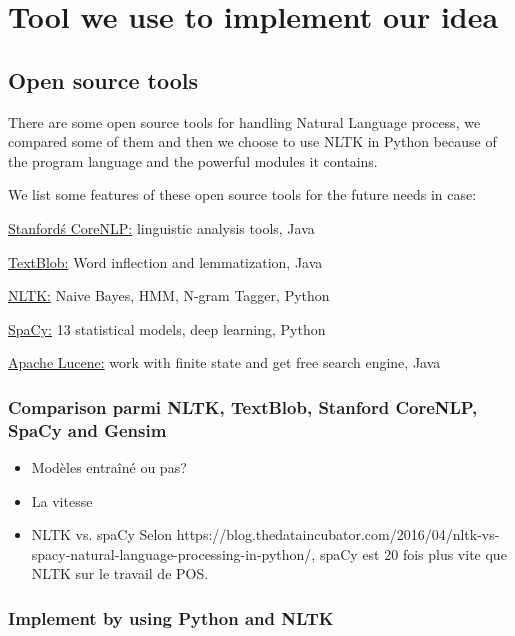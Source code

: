 \documentclass[a4paper]{article}
\begin{document}
\section{Tool we use to implement our idea}
\subsection{Open source tools}
There are some open source tools for handling Natural Language process, we compared some of them and then we choose to use NLTK in Python because of the program language and the powerful modules it contains. 

We list some features of these open source tools for the future needs in case:

\href{https://stanfordnlp.github.io/CoreNLP/}{Stanford\'s CoreNLP:} linguistic analysis tools, Java

\href{http://textblob.readthedocs.io/en/dev/}{TextBlob:} Word inflection and lemmatization, Java

\href{https://www.nltk.org/}{NLTK:} Naive Bayes, HMM, N-gram Tagger, Python

\href{https://spacy.io/}{SpaCy:} 13 statistical models, deep learning, Python

\href{http://lucene.apache.org/}{Apache Lucene:} work with finite state and get free search engine, Java

\subsubsection{Comparison parmi NLTK, TextBlob, Stanford CoreNLP, SpaCy and Gensim} 
\begin{itemize}
\item Modèles entraîné ou pas?
\item La vitesse
\item NLTK vs. spaCy  Selon https://blog.thedataincubator.com/2016/04/nltk-vs-spacy-natural-language-processing-in-python/, spaCy est 20 fois plus vite que NLTK sur le travail de POS.
\end{itemize}
\subsubsection{Implement by using Python and NLTK} 
\end{document}
